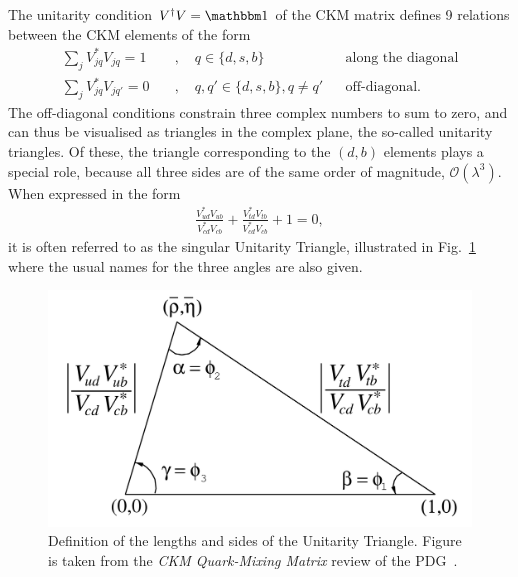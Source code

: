 The unitarity condition $V^\dagger V = \mathbbm 1$ of the CKM matrix defines 9 relations between the CKM elements of the form
\begin{subequations}
    \begin{align}
    \sum_j V^*_{jq}V_{jq} = 1\quad&,\quad q\in\{d, s, b\} & &\text{along the diagonal} \\
    \sum_j V^*_{jq}V_{jq'} = 0\quad&,\quad q, q'\in\{d, s, b\}, q\neq q' & &\text{off-diagonal}.
\end{align}
\end{subequations}
The off-diagonal conditions constrain three complex numbers to sum to zero, and can thus be visualised as triangles in the complex plane, the so-called unitarity triangles. Of these, the triangle corresponding to the $(d, b)$ elements plays a special role, because all three sides are of the same order of magnitude, $\mathcal O(\lambda^3)$. When expressed in the form
\begin{align}
    \frac{V^*_{ud}V_{ub}}{V^*_{cd}V_{cb}} +  \frac{V^*_{td}V_{tb}}{V^*_{cd}V_{cb}} +1 = 0,
\end{align}
it is often referred to as the singular Unitarity Triangle, illustrated in Fig.~\ref{fig:UT_definition} where the usual names for the three angles are also given.

\begin{figure}[tb]
    \centering
    \includegraphics[width=0.7\columnwidth]{figures/theory/UT_definition.png}
    \caption{Definition of the lengths and sides of the Unitarity Triangle. Figure is taken from the \emph{CKM Quark-Mixing Matrix} review of the PDG~\cite{PDG2019}.}
    \label{fig:UT_definition}
\end{figure}

